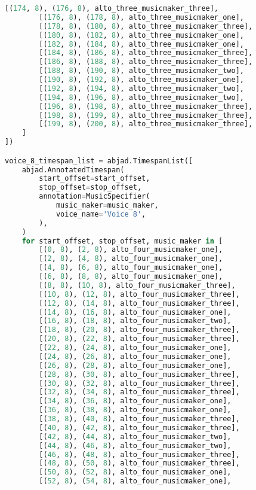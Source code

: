 \begin{lstlisting}[language=Python, caption=Invocation Source Code]
        [(174, 8), (176, 8), alto_three_musicmaker_three],
        [(176, 8), (178, 8), alto_three_musicmaker_one],
        [(178, 8), (180, 8), alto_three_musicmaker_three],
        [(180, 8), (182, 8), alto_three_musicmaker_one],
        [(182, 8), (184, 8), alto_three_musicmaker_one],
        [(184, 8), (186, 8), alto_three_musicmaker_three],
        [(186, 8), (188, 8), alto_three_musicmaker_three],
        [(188, 8), (190, 8), alto_three_musicmaker_two],
        [(190, 8), (192, 8), alto_three_musicmaker_one],
        [(192, 8), (194, 8), alto_three_musicmaker_two],
        [(194, 8), (196, 8), alto_three_musicmaker_two],
        [(196, 8), (198, 8), alto_three_musicmaker_three],
        [(198, 8), (199, 8), alto_three_musicmaker_three],
        [(199, 8), (200, 8), alto_three_musicmaker_three],
    ]
])

voice_8_timespan_list = abjad.TimespanList([
    abjad.AnnotatedTimespan(
        start_offset=start_offset,
        stop_offset=stop_offset,
        annotation=MusicSpecifier(
            music_maker=music_maker,
            voice_name='Voice 8',
        ),
    )
    for start_offset, stop_offset, music_maker in [
        [(0, 8), (2, 8), alto_four_musicmaker_one],
        [(2, 8), (4, 8), alto_four_musicmaker_one],
        [(4, 8), (6, 8), alto_four_musicmaker_one],
        [(6, 8), (8, 8), alto_four_musicmaker_one],
        [(8, 8), (10, 8), alto_four_musicmaker_three],
        [(10, 8), (12, 8), alto_four_musicmaker_three],
        [(12, 8), (14, 8), alto_four_musicmaker_three],
        [(14, 8), (16, 8), alto_four_musicmaker_one],
        [(16, 8), (18, 8), alto_four_musicmaker_two],
        [(18, 8), (20, 8), alto_four_musicmaker_three],
        [(20, 8), (22, 8), alto_four_musicmaker_three],
        [(22, 8), (24, 8), alto_four_musicmaker_one],
        [(24, 8), (26, 8), alto_four_musicmaker_one],
        [(26, 8), (28, 8), alto_four_musicmaker_one],
        [(28, 8), (30, 8), alto_four_musicmaker_three],
        [(30, 8), (32, 8), alto_four_musicmaker_three],
        [(32, 8), (34, 8), alto_four_musicmaker_three],
        [(34, 8), (36, 8), alto_four_musicmaker_one],
        [(36, 8), (38, 8), alto_four_musicmaker_one],
        [(38, 8), (40, 8), alto_four_musicmaker_three],
        [(40, 8), (42, 8), alto_four_musicmaker_three],
        [(42, 8), (44, 8), alto_four_musicmaker_two],
        [(44, 8), (46, 8), alto_four_musicmaker_two],
        [(46, 8), (48, 8), alto_four_musicmaker_three],
        [(48, 8), (50, 8), alto_four_musicmaker_three],
        [(50, 8), (52, 8), alto_four_musicmaker_one],
        [(52, 8), (54, 8), alto_four_musicmaker_one],

\end{lstlisting}
